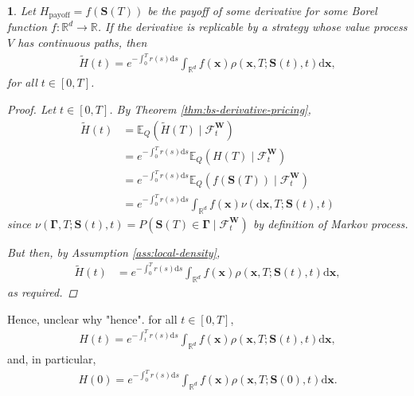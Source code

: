 \documentclass[english]{article}
\newcommand{\comment}[1]{\color{blue}#1\color{black}}
\numberwithin{equation}{section}
\numberwithin{figure}{section}
\theoremstyle{bolddescit}
\newtheorem{theorem}{\protect\theoremname}[section]
\theoremstyle{definition}
\theoremstyle{definition}
\theoremstyle{plain}
\theoremstyle{plain}
\theoremstyle{bolddesc}
\theoremstyle{plain}
\theoremstyle{remark}
\providecommand{\theoremname}{Theorem}
\begin{document}
\begin{theorem}\label{thm:local-derivative-pricing}
  Let $H_\text{payoff} = f(\mathbf{S}(T))$ be the payoff of some derivative for some Borel function $f : \mathbb{R}^d \to \mathbb{R}$.
  If the derivative is replicable by a strategy whose value process $V$ has continuous paths, then
  \begin{align*}
    \widetilde{H}(t) = e^{-\int_0^T r(s) \mathrm{d}s} \int_{\mathbb{R}^d} f(\mathbf{x}) \rho(\mathbf{x},T;\mathbf{S}(t),t) \mathrm{d}\mathbf{x},
  \end{align*}
  for all $t \in [0,T]$.

  \begin{proof}
    Let $t \in [0,T]$. By Theorem \ref{thm:bs-derivative-pricing},
    \begin{align*}
      \widetilde{H}(t)
      &= \mathbb{E}_Q(\widetilde{H}(T) \mid \mathcal{F}^\mathbf{W}_t)\\
      &= e^{-\int_0^T r(s) \mathrm{d}s} \mathbb{E}_Q(H(T) \mid \mathcal{F}^\mathbf{W}_t) \tag{$r$ is deterministic}\\
      &= e^{-\int_0^T r(s) \mathrm{d}s} \mathbb{E}_Q(f(\mathbf{S}(T)) \mid \mathcal{F}^\mathbf{W}_t)\\
      &= e^{-\int_0^T r(s) \mathrm{d}s} \int_{\mathbb{R}^d} f(\mathbf{x}) \nu(\mathrm{d}\mathbf{x},T;\mathbf{S}(t),t)
    \end{align*}
    since $\nu(\mathbf{\Gamma},T;\mathbf{S}(t),t) = P(\mathbf{S}(T) \in \mathbf{\Gamma} \mid \mathcal{F}^\mathbf{W}_t)$ by definition of Markov process.

    But then, by Assumption \ref{ass:local-density},
    \begin{align*}
      \widetilde{H}(t)
      &= e^{-\int_0^T r(s) \mathrm{d}s} \int_{\mathbb{R}^d} f(\mathbf{x}) \rho(\mathbf{x},T;\mathbf{S}(t),t) \mathrm{d}\mathbf{x},
    \end{align*}
    as required.
  \end{proof}
\end{theorem}

Hence,
\comment{unclear why "hence".}
 for all $t \in [0,T]$,
\begin{align*}
  H(t) = e^{-\int_t^T r(s) \mathrm{d}s} \int_{\mathbb{R}^d} f(\mathbf{x}) \rho(\mathbf{x},T;\mathbf{S}(t),t) \mathrm{d}\mathbf{x},
\end{align*}
and, in particular,
\begin{align*}
  H(0) = e^{-\int_0^T r(s) \mathrm{d}s} \int_{\mathbb{R}^d} f(\mathbf{x}) \rho(\mathbf{x},T;\mathbf{S}(0),t) \mathrm{d}\mathbf{x}.
\end{align*}
\end{document}
